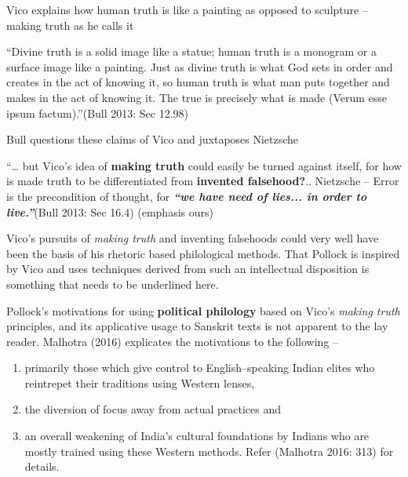 Vico explains how human truth is like a painting as opposed to sculpture – making truth as he calls it

\begin{myquote}
“Divine truth is a solid image like a statue; human truth is a monogram or a surface image like a painting. Just as divine truth is what God sets in order and creates in the act of knowing it, so human truth is what man puts together and makes in the act of knowing it. The true is precisely what is made (Verum esse ipsum factum).”\hfill (Bull 2013: Sec 12.98)
\end{myquote}

Bull questions these claims of Vico and juxtaposes Nietzsche

\begin{myquote}
“… but Vico’s idea of \textbf{making truth} could easily be turned against itself, for how is made truth to be differentiated from \textbf{invented falsehood?}.. Nietzsche – Error is the precondition of thought, for \textbf{\textit{“we have need of lies... in order to live.”}}\hfill (Bull 2013: Sec 16.4) (emphasis ours)
\end{myquote}

Vico’s pursuits of \textit{making truth} and inventing falsehoods could very well have been the basis of his rhetoric based philological methods. That Pollock is inspired by Vico and uses techniques derived from such an intellectual disposition is something that needs to be underlined here.

Pollock’s motivations for using \textbf{political philology} based on Vico’s \textit{making truth} principles, and its applicative usage to Sanskrit texts is not apparent to the lay reader. Malhotra (2016) explicates the motivations to the following –

\begin{enumerate}
\itemsep=0pt
\item primarily those which give control to English–speaking Indian elites who reintrepet their traditions using Western lenses,

 \item the diversion of focus away from actual practices and

 \item an overall weakening of India’s cultural foundations by Indians who are mostly trained using these Western methods. Refer (Malhotra 2016: 313) for details.

\end{enumerate}

